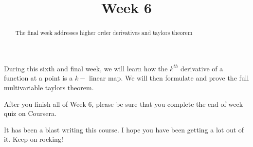 \documentclass{ximera}
\title{Week 6}
\begin{document}
\begin{abstract}
  The final week addresses higher order derivatives and taylors theorem
\end{abstract}

During this sixth and final week, we will learn how the $k^{th}$ derivative of a function at
a point is a $k-$ linear map.  We will then formulate and prove the full multivariable taylors theorem.

After you finish all of Week 6, please be sure that you complete the
end of week quiz on Coursera.

It has been a blast writing this course.  I hope you have been getting a lot out of it.  Keep on rocking!
\end{document}

